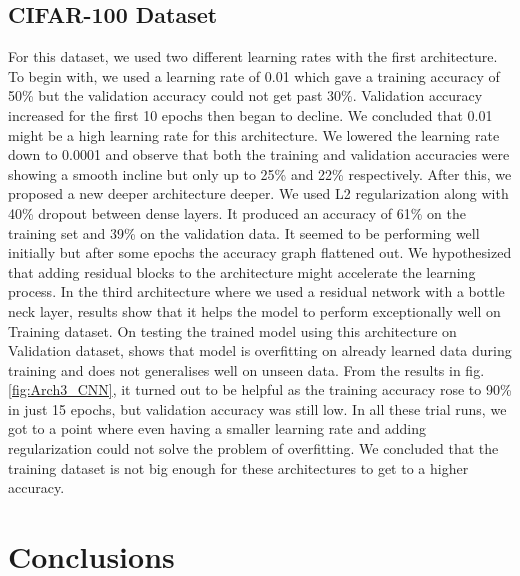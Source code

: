 \documentclass{article}
\begin{document}
\subsection{CIFAR-100 Dataset}
For this dataset, we used two different learning rates with the first architecture. To begin with, we used a learning rate of 0.01 which gave a training accuracy of 50\% but the validation accuracy could not get past 30\%. Validation accuracy increased for the first 10 epochs then began to decline. We concluded that 0.01 might be a high learning rate for this architecture. We lowered the learning rate down to 0.0001 and observe that both the training and validation accuracies were showing a smooth incline but only up to 25\% and 22\% respectively. After this, we proposed a new deeper architecture deeper. We used L2 regularization along with 40\% dropout between dense layers. It produced an accuracy of 61\% on the training set and 39\% on the validation data. It seemed to be performing well initially but after some epochs the accuracy graph flattened out. We hypothesized that adding residual blocks to the architecture might accelerate the learning process. In the third architecture where we used a residual network with a bottle neck layer, results show that it helps the model to perform exceptionally well on Training dataset. On testing the trained model using this architecture on Validation dataset, shows that model is overfitting on already learned data during training and does not generalises well on unseen data. From the results in fig. \ref{fig:Arch3_CNN}, it turned out to be helpful as the training accuracy rose to 90\% in just 15 epochs, but validation accuracy was still low. In all these trial runs, we got to a point where even having a smaller learning rate and adding regularization could not solve the problem of overfitting. We concluded that the training dataset is not big enough for these architectures to get to a higher accuracy.


\section{Conclusions}
\end{document}
